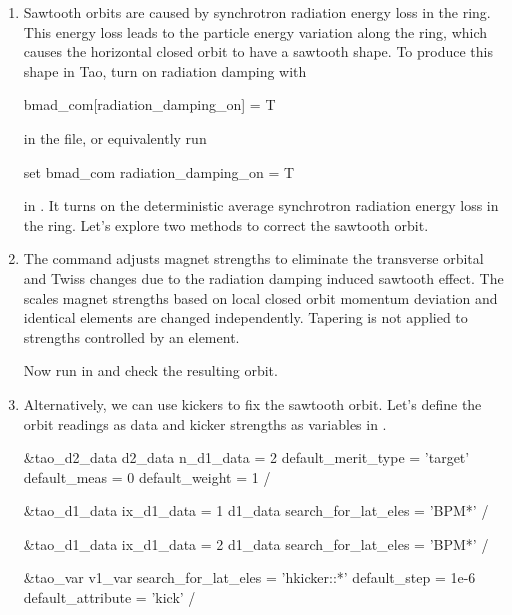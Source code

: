 \documentclass{hitec}     %
\begin{document}
{{{{\begin{enumerate}[leftmargin=*]
\item Sawtooth orbits are caused by synchrotron radiation energy loss in the ring. This energy loss leads to the particle energy variation along the ring, which causes the horizontal closed orbit to have a sawtooth shape. To produce this shape in Tao, turn on radiation damping with
\begin{code}
bmad_com[radiation_damping_on] = T 
\end{code}
in the  file, or equivalently run
\begin{code}
set bmad_com radiation_damping_on = T
\end{code}
in \tao. It turns on the deterministic average synchrotron radiation energy loss in the ring. Let's explore two methods to correct the sawtooth orbit.
\item The  command adjusts magnet strengths to eliminate the transverse orbital and Twiss changes due to the radiation damping induced sawtooth effect. The  scales magnet strengths based on local closed orbit momentum deviation and identical elements are changed independently. Tapering is not applied to strengths controlled by an  element.

Now run  in \tao and check the resulting orbit.
\item Alternatively, we can use kickers to fix the sawtooth orbit. Let's define the orbit readings as data and kicker strengths as variables in . 
\begin{code}
&tao_d2_data
  	d2_data%
  	n_d1_data = 2
  	default_merit_type = 'target'
  	default_meas = 0
  	default_weight = 1
/

&tao_d1_data
	ix_d1_data = 1
	d1_data%
	search_for_lat_eles = 'BPM*'
/

&tao_d1_data
	ix_d1_data = 2
	d1_data%
	search_for_lat_eles = 'BPM*'
/

&tao_var
	v1_var%
	search_for_lat_eles = 'hkicker::*'
	default_step = 1e-6
	default_attribute = 'kick'
/


\end{code}
\end{enumerate}}}}}
\end{document}
